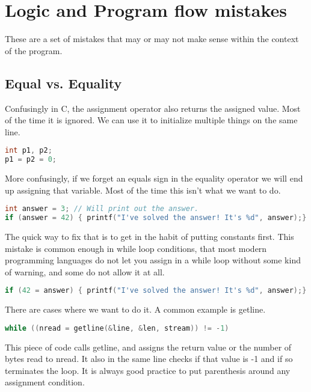\section{Logic and Program flow mistakes}

These are a set of mistakes that may or may not make sense within the context of the program.

\subsection{Equal vs. Equality}

Confusingly in C, the assignment operator also returns the assigned value.
Most of the time it is ignored.
We can use it to initialize multiple things on the same line.

\begin{lstlisting}[language=C]
int p1, p2;
p1 = p2 = 0;
\end{lstlisting}

More confusingly, if we forget an equals sign in the equality operator we will end up assigning that variable.
Most of the time this isn't what we want to do.

\begin{lstlisting}[language=C]
int answer = 3; // Will print out the answer.
if (answer = 42) { printf("I've solved the answer! It's %d", answer);}
\end{lstlisting}

The quick way to fix that is to get in the habit of putting constants first.
This mistake is common enough in while loop conditions, that most modern programming languages do not let you assign in a while loop without some kind of warning, and some do not allow it at all.

\begin{lstlisting}[language=C]
if (42 = answer) { printf("I've solved the answer! It's %d", answer);}
\end{lstlisting}

There are cases where we want to do it.
A common example is getline.

\begin{lstlisting}[language=C]
while ((nread = getline(&line, &len, stream)) != -1)
\end{lstlisting}

This piece of code calls getline, and assigns the return value or the number of bytes read to nread.
It also in the same line checks if that value is -1 and if so terminates the loop.
It is always good practice to put parenthesis around any assignment condition.

